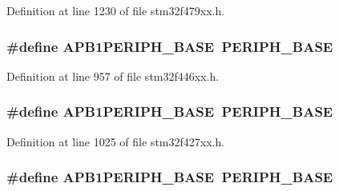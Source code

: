 Definition at line 1230 of file stm32f479xx.\+h.

\subsubsection[{\texorpdfstring{A\+P\+B1\+P\+E\+R\+I\+P\+H\+\_\+\+B\+A\+SE}{APB1PERIPH_BASE}}]{\setlength{\rightskip}{0pt plus 5cm}\#define A\+P\+B1\+P\+E\+R\+I\+P\+H\+\_\+\+B\+A\+SE~{\bf P\+E\+R\+I\+P\+H\+\_\+\+B\+A\+SE}}\hypertarget{group___peripheral__memory__map_ga45666d911f39addd4c8c0a0ac3388cfb}{}\label{group___peripheral__memory__map_ga45666d911f39addd4c8c0a0ac3388cfb}


Definition at line 957 of file stm32f446xx.\+h.

\subsubsection[{\texorpdfstring{A\+P\+B1\+P\+E\+R\+I\+P\+H\+\_\+\+B\+A\+SE}{APB1PERIPH_BASE}}]{\setlength{\rightskip}{0pt plus 5cm}\#define A\+P\+B1\+P\+E\+R\+I\+P\+H\+\_\+\+B\+A\+SE~{\bf P\+E\+R\+I\+P\+H\+\_\+\+B\+A\+SE}}\hypertarget{group___peripheral__memory__map_ga45666d911f39addd4c8c0a0ac3388cfb}{}\label{group___peripheral__memory__map_ga45666d911f39addd4c8c0a0ac3388cfb}


Definition at line 1025 of file stm32f427xx.\+h.

\subsubsection[{\texorpdfstring{A\+P\+B1\+P\+E\+R\+I\+P\+H\+\_\+\+B\+A\+SE}{APB1PERIPH_BASE}}]{\setlength{\rightskip}{0pt plus 5cm}\#define A\+P\+B1\+P\+E\+R\+I\+P\+H\+\_\+\+B\+A\+SE~{\bf P\+E\+R\+I\+P\+H\+\_\+\+B\+A\+SE}}\hypertarget{group___peripheral__memory__map_ga45666d911f39addd4c8c0a0ac3388cfb}{}\label{group___peripheral__memory__map_ga45666d911f39addd4c8c0a0ac3388cfb}


